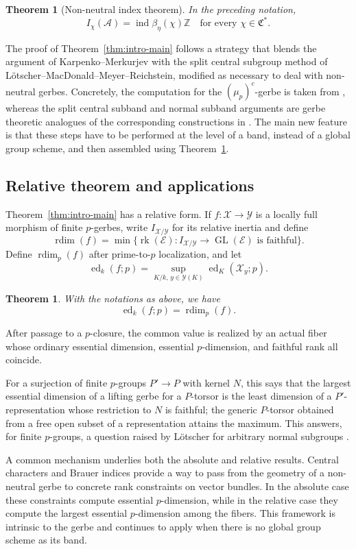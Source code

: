 \documentclass[11pt,reqno]{amsart}
\numberwithin{equation}{section}
\theoremstyle{plain}
\newtheorem{theo}[prop]{Theorem}
\theoremstyle{definition}
\def\cA{{\mathcal A}}
\def\cX{{\mathcal X}}
\def\cE{{\mathcal E}}
\def\cY{{\mathcal Y}}
\def\fC{{\mathfrak C}}
\def\ind{{\operatorname{ind}}}
\def\rk{{\operatorname{rk}}}
\def\GL{{\operatorname{GL}}}
\def\rdim{{\operatorname{rdim}}}
\def\ed{{\operatorname{ed}}}
\begin{document}
\begin{theo}[Non-neutral index theorem]\label{thm:intro-index}
In the preceding notation,
\[
I_\chi(\cA)=\ind\beta_\eta(\chi)\mathbb Z
\quad\text{for every }\chi\in\fC^*.
\]
\end{theo}

The proof of Theorem~\ref{thm:intro-main} follows a strategy that blends
the argument of Karpenko--Merkurjev with the split central subgroup method
of L\"otscher--MacDonald--Meyer--Reichstein, modified as necessary to deal
with non-neutral gerbes.  Concretely, the computation for the
$(\mu_p)^c$-gerbe is taken from \cite[Theorems~2.1 and~3.1]{KM}, whereas the
split central subband and normal subband arguments are gerbe theoretic
analogues of the corresponding constructions in \cite{LMMRTori}.  The main
new feature is that these steps have to be performed at the level of a
band, instead of a global group scheme, and then assembled using
Theorem~\ref{thm:intro-index}.

\subsection{Relative theorem and applications}

Theorem~\ref{thm:intro-main} has a relative form.  If
$f:\cX\to\cY$ is a locally full morphism of finite $p$-gerbes, write
$I_{\cX/\cY}$ for its relative inertia and define
\[
\rdim(f)=\min\{\rk(\cE):
I_{\cX/\cY}\to\GL(\cE)\text{ is faithful}\}.
\]
Define $\rdim_p(f)$ after prime-to-$p$ localization, and let
\[
\ed_k(f;p)=
\sup_{K/k,\,y\in\cY(K)}
\ed_K(\cX_y;p).
\]
\begin{theo}
    With the notations as above, we have
\[
\ed_k(f;p)=\rdim_p(f).
\]
\end{theo}
After passage to a $p$-closure, the common value is realized by an actual
fiber whose ordinary essential dimension, essential $p$-dimension, and
faithful rank all coincide.

For a surjection of finite $p$-groups $P'\to P$ with kernel $N$, this says
that the largest essential dimension of a lifting gerbe for a $P$-torsor is
the least dimension of a $P'$-representation whose restriction to $N$ is
faithful; the generic $P$-torsor obtained from a free open subset of a
representation attains the maximum.  This answers, for finite
$p$-groups, a question raised by L\"otscher for arbitrary normal subgroups
\cite[Remark~4.4]{LotscherFiber}.

A common mechanism underlies both the absolute and relative results.
Central characters and Brauer indices provide a way to pass from the
geometry of a non-neutral gerbe to concrete rank constraints on vector
bundles.  In the absolute case these constraints compute essential
$p$-dimension, while in the relative case they compute the largest
essential $p$-dimension among the fibers.  This framework is intrinsic to
the gerbe and continues to apply when there is no global group scheme as its band.
\end{document}
